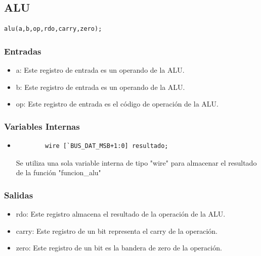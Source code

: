 \documentclass[letterpaper]{sae}
\begin{document}
\subsection{ALU}
\begin{verbatim}
alu(a,b,op,rdo,carry,zero);
\end{verbatim} 

\begin{figure}[H] %
\label{fig:alu}
\end{figure}

\subsubsection{Entradas}
\begin{itemize}
	\item a: Este registro de entrada es un operando de la ALU.
	\item b: Este registro de entrada es un operando de la ALU.
	\item op: Este registro de entrada es el código de operación de la ALU.
\end{itemize}
\subsubsection{Variables Internas}
\begin{itemize}
	\item \begin{verbatim}
		wire [`BUS_DAT_MSB+1:0] resultado;
	\end{verbatim}
	Se utiliza una sola variable interna de tipo "wire" para almacenar el
	resultado de la función "funcion\_alu" 
\end{itemize}
\subsubsection{Salidas}
\begin{itemize}
	\item rdo: Este registro almacena el resultado de la operación de la ALU.
	\item carry: Este registro de un bit representa el carry de la operación.
	\item zero: Este registro de un bit es la bandera de zero de la operación.
\end{itemize}
\end{document}
